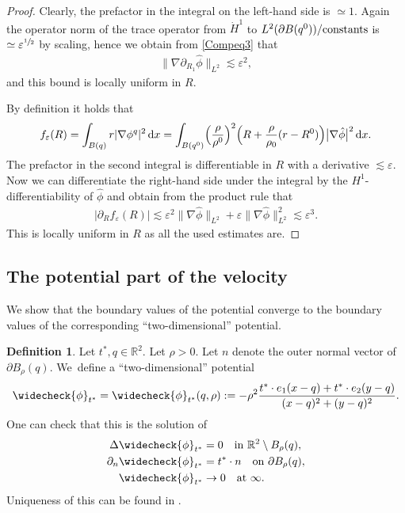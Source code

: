 \documentclass[JEP,XML,SOM,Unicode,published]{cedram}
\let\epsilon\varepsilon
\let\backslash\setminus
\newcommand{\constants}{\textup{constants}}
\theoremstyle{definition}
\newtheorem{definition}[theorem]{Definition}
\newcommand\R{\mathbb{R}}
\newcommand\bnorm[1]{\bigl\lVert #1\bigr\rVert}
\newcommand\eq{=}
\newcommand\dd{\,\mathrm{d}}
\newcommand\dx{\dd x}
\let\chek\widecheck
\let\de\partial
\let\eps\epsilon
\begin{document}
\begin{proof}
Clearly, the prefactor in the integral on the left-hand side is $\simeq 1$. Again the operator norm of the trace operator from $\dot{H}^1$ to $L^2(\de B(q^0))/\constants$ is $\simeq \eps^{\sfrac{1}{2}}$ by scaling, hence we obtain from \eqref{Compeq3} that
\begin{align*}
\bnorm{\nabla \de_{R_1}\hat{\phi}}_{L^2}\lesssim \eps^2,
\end{align*}
and this bound is locally uniform in $R$.

By definition it holds that
\begin{align*}
f_\eps(R)\eq\int_{B(q)} r|\nabla \phi^q|^2\dx\eq \int_{B(q^0)}\Bigl(\frac{\rho}{\rho^0}\Bigr)^2\Bigl(R+\frac{\rho}{\rho_0}(r-R^0)\Bigr) \bigl|\nabla\hat{\phi}\bigr|^2\dx.
\end{align*}
The prefactor in the second integral is differentiable in $R$ with a derivative $\lesssim \eps$. Now we can differentiate the right-hand side under the integral by the $H^1$-differentiability of $\hat{\phi}$ and obtain from the product rule that
\begin{align*}
|\de_Rf_\eps(R)|\lesssim \eps^2\bnorm{\nabla\hat{\phi}}_{L^2}+\eps\bnorm{\nabla\hat{\phi}}_{L^2}^2\lesssim \eps^3.
\end{align*}
This is locally uniform in $R$ as all the used estimates are.
\end{proof}

\subsection{The potential part of the velocity}
We show that the boundary values of the potential converge to the boundary values of the corresponding ``two-dimensional'' potential.

 \label{sing body subsec}
\begin{definition}\label{def flat func}
Let $t^*,q\in \R^2$. Let $\rho>0$. Let $n$ denote the outer normal vector of $\de B_\rho(q)$. We~define a ``two-dimensional'' potential
\begin{align*}
\chek{\phi}_{t^*}\eq\chek{\phi}_{t^*}(q,\rho):=-\rho^2\frac{t^*\cdot e_1(x-q)+t^*\cdot e_2(y-q)}{(x-q)^2+(y-q)^2}.
\end{align*}
One can check that this is the solution of
\begin{align}
\Delta \chek{\phi}_{t^*}&\eq0\quad\text{in $\mathbb{R}^2\backslash B_\rho(q)$}\label{Pot1},\\
\de_n\chek{\phi}_{t^*}&\eq t^*\cdot n \quad\text{on $\de B_\rho(q)$}\label{Pot2},\\
\chek{\phi}_{t^*}&\to 0 \quad\text{at $\infty$}.\label{Pot3}
\end{align}
Uniqueness of this can be found \eg in \cite[Th.\,3.1]{Amrouche}.
\end{definition}
\end{document}
